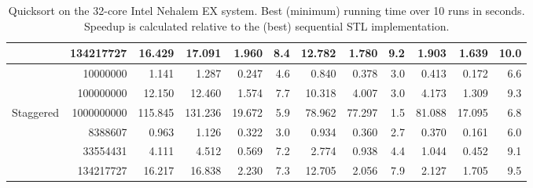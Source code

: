 \documentclass[preprint]{sigplanconf}
\begin{document}
\begin{table*}[t!]
\begin{center}
\begin{tabular}{|lr|rr|rrr|rrr||rr|}
 & 134217727 & 16.429 & 17.091 & 1.960 & 8.4 & 12.782 & 1.780 & 9.2 & 1.903 & 1.639 & 10.0 \\
\hline
 & 10000000 & 1.141 & 1.287 & 0.247 & 4.6 & 0.840 & 0.378 & 3.0 & 0.413 & 0.172 & 6.6 \\
 & 100000000 & 12.150 & 12.460 & 1.574 & 7.7 & 10.318 & 4.007 & 3.0 & 4.173 & 1.309 & 9.3 \\
Staggered & 1000000000 & 115.845 & 131.236 & 19.672 & 5.9 & 78.962 & 77.297 & 1.5 & 81.088 & 17.095 & 6.8 \\
 & 8388607 & 0.963 & 1.126 & 0.322 & 3.0 & 0.934 & 0.360 & 2.7 & 0.370 & 0.161 & 6.0 \\
 & 33554431 & 4.111 & 4.512 & 0.569 & 7.2 & 2.774 & 0.938 & 4.4 & 1.044 & 0.452 & 9.1 \\
 & 134217727 & 16.217 & 16.838 & 2.230 & 7.3 & 12.705 & 2.056 & 7.9 & 2.127 & 1.705 & 9.5 \\

\hline
\end{tabular}
\end{center}
\caption{Quicksort on the 32-core Intel Nehalem EX system. 
Best (minimum) running time over 10 runs in seconds.
Speedup is calculated relative to the (best) sequential STL implementation.}
\label{tab:sort_meret_min}
\end{table*}
\end{document}
